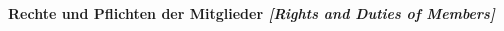 \documentclass[10pt]{article}
\newcounter{qcounter}
\begin{document}
\begin{list}{{\bf Artikel :~}}{}
\item {\bf Rechte und Pflichten der Mitglieder {\it[Rights and Duties of Members]}}\label{Duties}\\


\end{list}
\end{document}
